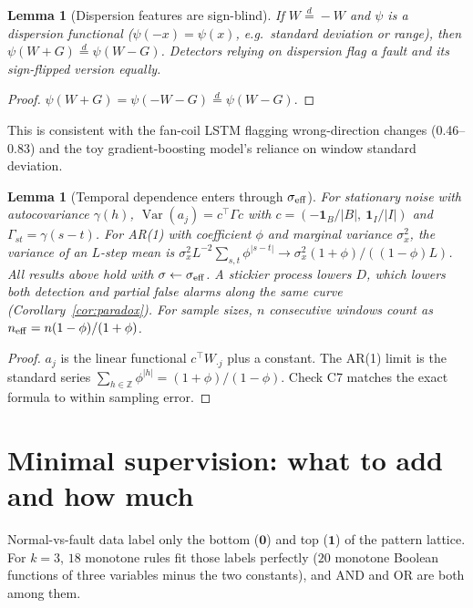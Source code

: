 \documentclass[11pt]{article}
\newtheorem{lemma}[theorem]{Lemma}
\theoremstyle{definition}
\theoremstyle{remark}
\newcommand{\1}{\mathbf{1}}
\begin{document}
\begin{lemma}[Dispersion features are sign-blind]\label{lem:sign}
If $W\overset{d}{=}-W$ and $\psi$ is a dispersion functional ($\psi(-x)=\psi(x)$, e.g.\ standard deviation or range), then $\psi(W+G)\overset{d}{=}\psi(W-G)$. Detectors relying on dispersion flag a fault and its sign-flipped version equally.
\end{lemma}
\begin{proof}
$\psi(W+G)=\psi(-W-G)\overset{d}{=}\psi(W-G)$.
\end{proof}
This is consistent with the fan-coil LSTM flagging wrong-direction changes (0.46--0.83) and the toy gradient-boosting model's reliance on window standard deviation.

\begin{lemma}[Temporal dependence enters through $\sigma_{\rm eff}$]\label{lem:ar}
For stationary noise with autocovariance $\gamma(h)$, $\operatorname{Var}(a_j)=c^\top\Gamma c$ with $c=(-\1_B/|B|,\ \1_I/|I|)$ and $\Gamma_{st}=\gamma(s-t)$. For AR(1) with coefficient $\phi$ and marginal variance $\sigma_x^2$, the variance of an $L$-step mean is $\sigma_x^2L^{-2}\sum_{s,t}\phi^{|s-t|}\to\sigma_x^2(1+\phi)/((1-\phi)L)$. All results above hold with $\sigma\leftarrow\sigma_{\rm eff}$. A stickier process lowers $D$, which lowers both detection and partial false alarms along the same curve (Corollary~\ref{cor:paradox}). For sample sizes, $n$ consecutive windows count as $n_{\rm eff}=n(1-\phi)/(1+\phi)$.
\end{lemma}
\begin{proof}
$a_j$ is the linear functional $c^\top W_{\cdot j}$ plus a constant. The AR(1) limit is the standard series $\sum_{h\in\mathbb Z}\phi^{|h|}=(1+\phi)/(1-\phi)$. Check C7 matches the exact formula to within sampling error.
\end{proof}

\section{Minimal supervision: what to add and how much}\label{sec:supervision}
Normal-vs-fault data label only the bottom ($\bm0$) and top ($\1$) of the pattern lattice. For $k=3$, $18$ monotone rules fit those labels perfectly ($20$ monotone Boolean functions of three variables minus the two constants), and AND and OR are both among them.
\end{document}
